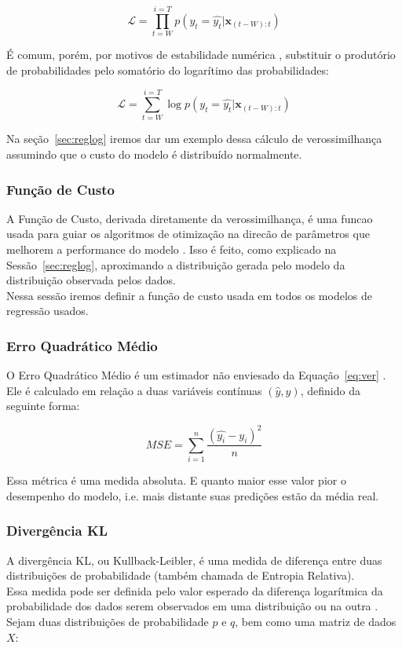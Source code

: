 \[
\mathcal{L} = \prod_{t=W}^{i=T} p(y_t=\hat{y_t} | \textbf{x}_{(t-W):t}) 
\]

É comum, porém, por motivos de estabilidade numérica \citep{dlbook}, substituir
o produtório de probabilidades pelo somatório do logarítimo das probabilidades: 


\[
  \mathcal{L} = \sum_{t=W}^{i=T} \log{p(y_t=\hat{y_t} | \textbf{x}_{(t-W):t})}
\]


Na seção~\ref{sec:reglog} iremos dar um exemplo dessa cálculo de verossimilhança
assumindo que o custo do modelo é distribuído normalmente.

\subsubsection{Função de Custo}

A Função de Custo, derivada diretamente da verossimilhança,
é uma funcao usada para guiar os algoritmos de otimização na direcão de parâmetros que melhorem a performance do modelo \cite{dlbook}. Isso é feito, como explicado na Sessão~\ref{sec:reglog}, aproximando a distribuição gerada pelo modelo da distribuição observada pelos dados. \\

Nessa sessão iremos definir a função de custo usada em todos os modelos de regressão usados. \\

\subsubsection{Erro Quadrático Médio}
\label{sec:MSE}

O Erro Quadrático Médio é um estimador não enviesado da Equação~\ref{eq:ver}
\cite{dlbook}. Ele é calculado em relação a duas variáveis contínuas
$(\hat{y},y)$, definido da seguinte forma:

\[MSE = \sum^n_{i=1}\frac{(\hat{y_i} - y_i)^2}{n}\]

Essa métrica é uma medida absoluta. E quanto maior esse valor pior o desempenho
do modelo, i.e. mais distante suas predições estão da média real. \\

\subsubsection{Divergência KL}

A divergência KL, ou Kullback-Leibler, é uma medida de diferença entre duas distribuições de probabilidade (também chamada de Entropia Relativa). \\
Essa medida pode ser definida pelo valor esperado da diferença logarítmica da probabilidade dos dados serem observados em uma distribuição ou na outra \citep{dlbook}. \\
Sejam duas distribuições de probabilidade $p$ e $q$, bem como uma matriz de dados $X$: \\

